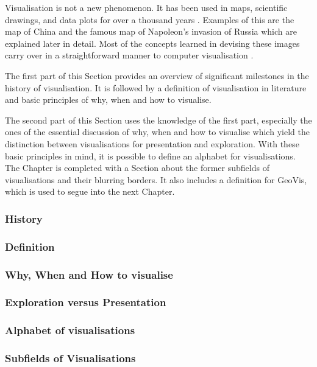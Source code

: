 Visualisation is not a new phenomenon. It has been used in maps, scientific drawings, and data plots for over a thousand years . Examples of this are the map of China and the famous map of Napoleon's invasion of Russia which are explained later in detail. Most of the concepts learned in devising these images carry over in a straightforward manner to computer visualisation .

The first part of this Section provides an overview of significant milestones in the history of visualisation. It is followed by a definition of visualisation in literature and basic principles of why, when and how to visualise.

\cbstart
The second part of this Section uses the knowledge of the first part, especially the ones of the essential discussion of why, when and how to visualise which yield the distinction between visualisations for presentation and exploration. With these basic principles in mind, it is possible to define an alphabet for visualisations. The Chapter is completed with a Section about the former subfields of visualisations and their blurring borders. It also includes a definition for \acl{GeoVis}, which is used to segue into the next Chapter.
\cbend

\subsubsection{History}
\label{s:history}


\subsubsection{Definition}
\label{s:definition}


\subsubsection{Why, When and How to visualise}
\label{s:basics}


\subsubsection{Exploration versus Presentation}
\label{s:eda}


\subsubsection{Alphabet of visualisations}


\subsubsection{Subfields of Visualisations}

